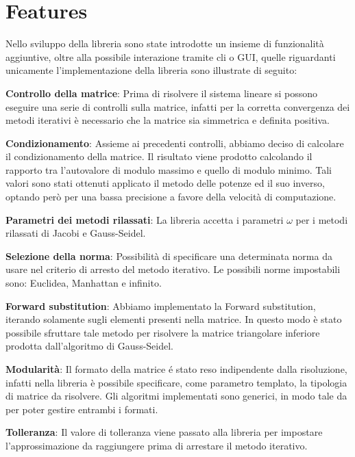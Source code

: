 \section{Features}

Nello sviluppo della libreria sono state introdotte un insieme di funzionalità aggiuntive, oltre alla possibile interazione tramite cli o GUI, quelle riguardanti unicamente l'implementazione della libreria sono illustrate di seguito:

\begin{itemize}
	\begin{item}
		\textbf{Controllo della matrice}: Prima di risolvere il sistema lineare si possono eseguire una serie di controlli sulla matrice, infatti per la corretta convergenza dei metodi iterativi è necessario che la matrice sia simmetrica e definita positiva.
	\end{item}
	\begin{item}
		\textbf{Condizionamento}: Assieme ai precedenti controlli, abbiamo deciso di calcolare il condizionamento della matrice. Il risultato viene prodotto calcolando il rapporto tra l'autovalore di modulo massimo e quello di modulo minimo. Tali valori sono stati ottenuti applicato il metodo delle potenze ed il suo inverso, optando però per una bassa precisione a favore della velocità di computazione.
	\end{item}
	\begin{item}
		\textbf{Parametri dei metodi rilassati}: La libreria accetta i parametri $\omega$ per i metodi rilassati di Jacobi e Gauss-Seidel.
	\end{item}
	\begin{item}
		\textbf{Selezione della norma}: Possibilità di specificare una determinata norma da usare nel criterio di arresto del metodo iterativo. Le possibili norme impostabili sono: Euclidea, Manhattan e infinito.
	\end{item}
	\begin{item}
		\textbf{Forward substitution}: Abbiamo implementato la Forward substitution, iterando solamente sugli elementi presenti nella matrice. In questo modo è stato possibile sfruttare tale metodo per risolvere la matrice triangolare inferiore prodotta dall'algoritmo di Gauss-Seidel.
	\end{item}
	\begin{item}
		\textbf{Modularità}: Il formato della matrice é stato reso indipendente dalla risoluzione, infatti nella libreria è possibile specificare, come parametro templato, la tipologia di matrice da risolvere. Gli algoritmi implementati sono generici, in modo tale da per poter gestire entrambi i formati.
	\end{item}
	\begin{item}
		\textbf{Tolleranza}: Il valore di tolleranza viene passato alla libreria per impostare l'approssimazione da raggiungere prima di arrestare il metodo iterativo.
	\end{item}

\end{itemize}